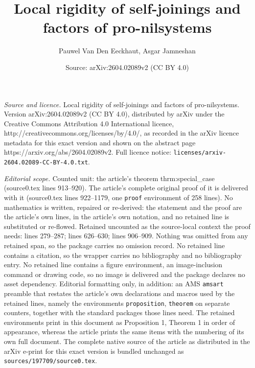 \documentclass[10pt,a4paper]{amsart}
\title{Local rigidity of self-joinings and factors of pro-nilsystems}
\author{Pauwel Van Den Eeckhaut, Asgar Jamneshan}
\date{Source: arXiv:2604.02089v2 (CC BY 4.0)}
\begin{document}
\maketitle

\noindent\emph{Source and licence.} Local rigidity of self-joinings and factors of pro-nilsystems. Version arXiv:2604.02089v2 (CC BY 4.0), distributed by arXiv under the Creative Commons Attribution 4.0 International licence, http://creativecommons.org/licenses/by/4.0/, as recorded in the arXiv licence metadata for this exact version and shown on the abstract page https://arxiv.org/abs/2604.02089v2. Full licence notice: \texttt{licenses/arxiv-2604.02089-CC-BY-4.0.txt}.\par\smallskip

\noindent\textit{Editorial scope.} Counted unit: the article's theorem thrm:special\_case (source0.tex lines 913--920). The article's complete original proof of it is delivered with it (source0.tex lines 922--1179, one \texttt{proof} environment of 258 lines). No mathematics is written, repaired or re-derived: the statement and the proof are the article's own lines, in the article's own notation, and no retained line is substituted or re-flowed.  Retained uncounted as the source-local context the proof needs: lines 279--287; lines 626--630; lines 906--909.  Nothing was omitted from any retained span, so the package carries no omission record.  No retained line contains a citation, so the wrapper carries no bibliography and no bibliography entry.  No retained line contains a figure environment, an image-inclusion command or drawing code, so no image is delivered and the package declares no asset dependency.  Editorial formatting only, in addition: an AMS \texttt{amsart} preamble that restates the article's own declarations and macros used by the retained lines, namely the environments \texttt{proposition}, \texttt{theorem} on separate counters, together with the standard packages those lines need.  The retained environments print in this document as Proposition 1, Theorem 1 in order of appearance, whereas the article prints the same items with the numbering of its own full document.  The complete native source of the article as distributed in the arXiv e-print for this exact version is bundled unchanged as \texttt{sources/197709/source0.tex}.
\end{document}
